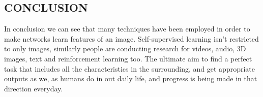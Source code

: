 \documentclass[a4paper, 12pt]{article}
\begin{document}

\newpage
\begin{center}
\section{CONCLUSION}
\end{center}
\par
In conclusion we can see that many techniques have been employed in order to make networks learn features of an image. Self-supervised learning isn't restricted to only images, similarly people are conducting research for videos, audio, 3D images, text and reinforcement learning too. The ultimate aim to find a perfect task that includes all the characteristics in the surrounding, and get appropriate outputs as we, as humans do in out daily life, and progress is being made in that direction everyday.

\\

\newpage
%
%

\end{document}
